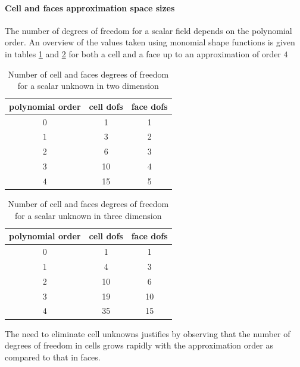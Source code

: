\paragraph{Cell and faces approximation space sizes}

The number of degrees of freedom for a scalar field depends on the polynomial order. An overview of the values taken using monomial shape functions is given in tables \ref{table_num_dofs_2D} and \ref{table_num_dofs_3D} for both a cell and a face up to an approximation of order $4$
%
%
%
\begin{table}[H]
\centering
\begin{tabular}{||c c c||} 
    \hline
    polynomial order & cell dofs & face dofs \\ [0.5ex] 
    \hline\hline
    $0$ & 1 & 1
    \\ \hline
    $1$ & 3 & 2
    \\ \hline
    $2$ & 6 & 3
    \\ \hline
    $3$ & 10 & 4
    \\ \hline
    $4$ & 15 & 5
    \\ \hline
\end{tabular}
\caption{Number of cell and faces degrees of freedom for a scalar unknown in two dimension}
\label{table_num_dofs_2D}
\end{table}
%
%
%
\begin{table}[H]
\centering
\begin{tabular}{||c c c||} 
    \hline
    polynomial order & cell dofs & face dofs \\ [0.5ex] 
    \hline\hline
    $0$ & 1 & 1
    \\ \hline
    $1$ & 4 & 3
    \\ \hline
    $2$ & 10 & 6
    \\ \hline
    $3$ & 19 & 10
    \\ \hline
    $4$ & 35 & 15
    \\ \hline
\end{tabular}
\caption{Number of cell and faces degrees of freedom for a scalar unknown in three dimension}
\label{table_num_dofs_3D}
\end{table}
%
%
%
The need to eliminate cell unknowns justifies by observing that the number of degrees of freedom in cells grows rapidly with the approximation order as compared to that in faces.

